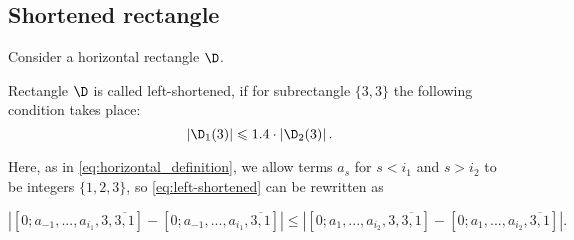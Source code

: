 \subsection{Shortened rectangle}
\label{sbsc:shortened}

Consider a horizontal rectangle $\D$.

\begin{definition}
	Rectangle $\D$ is called left-shortened,
	if for subrectangle $\{3, 3\}$ the following condition takes place:
	\begin{equation}
		\label{eq:left-shortened}
		\left| \D_1(3) \right| \leqslant 1.4 \cdot \left| \D_2(3) \right|.
	\end{equation}
\end{definition}

Here, as in \ref{eq:horizontal_definition}, we allow terms $a_s$ for $s < i_1$ and $s > i_2$ to be integers $\{1, 2, 3\}$,
so \ref{eq:left-shortened} can be rewritten as

\begin{equation*}
	\left|
		\left[ 0; a_{-1}, ..., a_{i_1}, 3, \overline{3, 1} \right] -
		\left[ 0; a_{-1}, ..., a_{i_1}, \overline{3, 1} \right]
	\right| \leqslant \left|
		\left[ 0; a_{1}, ..., a_{i_2}, 3, \overline{3, 1} \right] -
		\left[ 0; a_{1}, ..., a_{i_2}, \overline{3, 1} \right]
	\right|.
\end{equation*}
